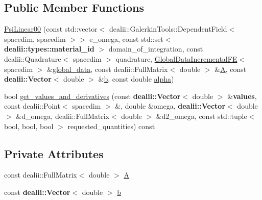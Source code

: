 \subsection*{Public Member Functions}
\begin{DoxyCompactItemize}
\item 
\hyperlink{classincremental_f_e_1_1_psi_linear_interface00_ab01410b530422dc716ca44823b7e7350}{Psi\+Linear00} (const std\+::vector$<$ dealii\+::\+Galerkin\+Tools\+::\+Dependent\+Field$<$ spacedim, spacedim $>$$>$ e\+\_\+omega, const std\+::set$<$ {\bf dealii\+::types\+::material\+\_\+id} $>$ domain\+\_\+of\+\_\+integration, const dealii\+::\+Quadrature$<$ spacedim $>$ quadrature, \hyperlink{classincremental_f_e_1_1_global_data_incremental_f_e}{Global\+Data\+Incremental\+FE}$<$ spacedim $>$ \&\hyperlink{classincremental_f_e_1_1_psi_3_01spacedim_00_01spacedim_01_4_abf0a4804877fd7cc9bd1b90e52760ba9}{global\+\_\+data}, const dealii\+::\+Full\+Matrix$<$ double $>$ \&\hyperlink{classincremental_f_e_1_1_psi_linear_interface00_a58c4e916fb9d722b16963e213235ed81}{A}, const {\bf dealii\+::\+Vector}$<$ double $>$ \&\hyperlink{classincremental_f_e_1_1_psi_linear_interface00_a67da23f105ba3e30884099c71c972b56}{b}, const double \hyperlink{classincremental_f_e_1_1_psi_3_01spacedim_00_01spacedim_01_4_af7b8227188dbdd6ada35b9445d96c79d}{alpha})
\item 
bool \hyperlink{classincremental_f_e_1_1_psi_linear_interface00_a1e27fceffec33dcb41de27fe3726cec2}{get\+\_\+values\+\_\+and\+\_\+derivatives} (const {\bf dealii\+::\+Vector}$<$ double $>$ \&{\bf values}, const dealii\+::\+Point$<$ spacedim $>$ \&, double \&omega, {\bf dealii\+::\+Vector}$<$ double $>$ \&d\+\_\+omega, dealii\+::\+Full\+Matrix$<$ double $>$ \&d2\+\_\+omega, const std\+::tuple$<$ bool, bool, bool $>$ requested\+\_\+quantities) const 
\end{DoxyCompactItemize}
\subsection*{Private Attributes}
\begin{DoxyCompactItemize}
\item 
const dealii\+::\+Full\+Matrix$<$ double $>$ \hyperlink{classincremental_f_e_1_1_psi_linear_interface00_a58c4e916fb9d722b16963e213235ed81}{A}
\item 
const {\bf dealii\+::\+Vector}$<$ double $>$ \hyperlink{classincremental_f_e_1_1_psi_linear_interface00_a67da23f105ba3e30884099c71c972b56}{b}
\end{DoxyCompactItemize}


